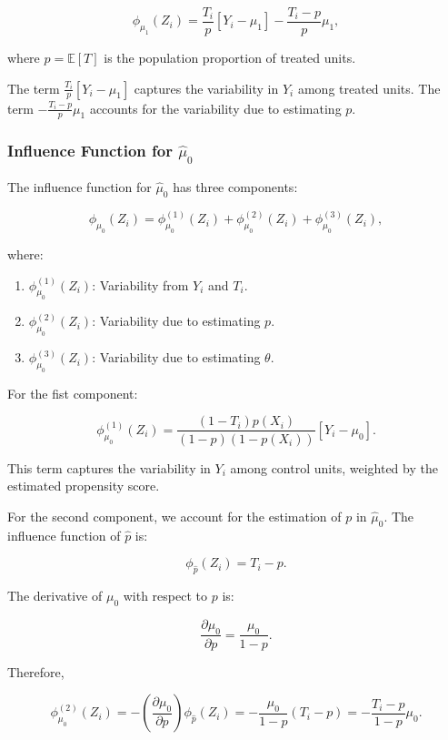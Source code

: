 \documentclass{article}
\begin{document}
\[
\phi_{\mu_1}(Z_i) = \frac{T_i}{p} [Y_i - \mu_1] - \frac{T_i - p}{p} \mu_1,
\]

where \( p = \mathbb{E}[T] \) is the population proportion of treated units.

The term \( \frac{T_i}{p} [Y_i - \mu_1] \) captures the variability in \( Y_i \) among treated units. The term \( -\frac{T_i - p}{p} \mu_1 \) accounts for the variability due to estimating \( p \).

\subsubsection*{Influence Function for \( \hat{\mu}_0 \)}

The influence function for \( \hat{\mu}_0 \) has three components:

\[
\phi_{\mu_0}(Z_i) = \phi_{\mu_0}^{(1)}(Z_i) + \phi_{\mu_0}^{(2)}(Z_i) + \phi_{\mu_0}^{(3)}(Z_i),
\]

where:

\begin{enumerate}
  \item \( \phi_{\mu_0}^{(1)}(Z_i) \): Variability from \( Y_i \) and \( T_i \).
  \item \( \phi_{\mu_0}^{(2)}(Z_i) \): Variability due to estimating \( p \).
  \item \( \phi_{\mu_0}^{(3)}(Z_i) \): Variability due to estimating \( \theta \).
\end{enumerate}

For the fist component:

\[
\phi_{\mu_0}^{(1)}(Z_i) = \frac{(1 - T_i) p(X_i)}{(1 - p)(1 - p(X_i))} [Y_i - \mu_0].
\]

This term captures the variability in \( Y_i \) among control units, weighted by the estimated propensity score.

For the second component, we account for the estimation of \( p \) in \( \hat{\mu}_0 \). The influence function of \( \hat{p} \) is:

\[
\phi_{\hat{p}}(Z_i) = T_i - p.
\]

The derivative of \( \mu_0 \) with respect to \( p \) is:

\[
\frac{\partial \mu_0}{\partial p} = \frac{\mu_0}{1 - p}.
\]

Therefore,

\[
\phi_{\mu_0}^{(2)}(Z_i) = -\left( \frac{\partial \mu_0}{\partial p} \right) \phi_{\hat{p}}(Z_i) = -\frac{\mu_0}{1 - p} (T_i - p) = -\frac{T_i - p}{1 - p} \mu_0.
\]
\end{document}
